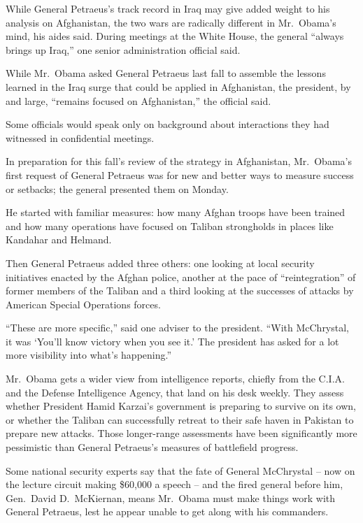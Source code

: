 ﻿\documentclass[12pt]{article}
\begin{document}
While General Petraeus's track record in Iraq may give added weight to his analysis on Afghanistan,
the two wars are radically different in Mr.~Obama's mind, his aides said. During meetings at the
White House, the general ``always brings up Iraq,'' one senior administration official said.

While Mr.~Obama asked General Petraeus last fall to assemble the lessons learned in the Iraq surge
that could be applied in Afghanistan, the president, by and large, ``remains focused on
Afghanistan,'' the official said.

Some officials would speak only on background about interactions they had witnessed in confidential
meetings.

In preparation for this fall's review of the strategy in Afghanistan, Mr.~Obama's first request of
General Petraeus was for new and better ways to measure success or setbacks; the general presented
them on Monday.

He started with familiar measures: how many Afghan troops have been trained and how many operations
have focused on Taliban strongholds in places like Kandahar and Helmand.

Then General Petraeus added three others: one looking at local security initiatives enacted by the
Afghan police, another at the pace of ``reintegration'' of former members of the Taliban and a third
looking at the successes of attacks by American Special Operations forces.

``These are more specific,'' said one adviser to the president. ``With McChrystal, it was `You'll
know victory when you see it.' The president has asked for a lot more visibility into what's
happening.''

Mr.~Obama gets a wider view from intelligence reports, chiefly from the C.I.A. and the Defense
Intelligence Agency, that land on his desk weekly. They assess whether President Hamid Karzai's
government is preparing to survive on its own, or whether the Taliban can successfully retreat to
their safe haven in Pakistan to prepare new attacks. Those longer-range assessments have been
significantly more pessimistic than General Petraeus's measures of battlefield progress.

Some national security experts say that the fate of General McChrystal -- now on the lecture circuit
making \$60,000 a speech -- and the fired general before him, Gen.~David D.~McKiernan, means
Mr.~Obama must make things work with General Petraeus, lest he appear unable to get along with his
commanders.
\end{document}
